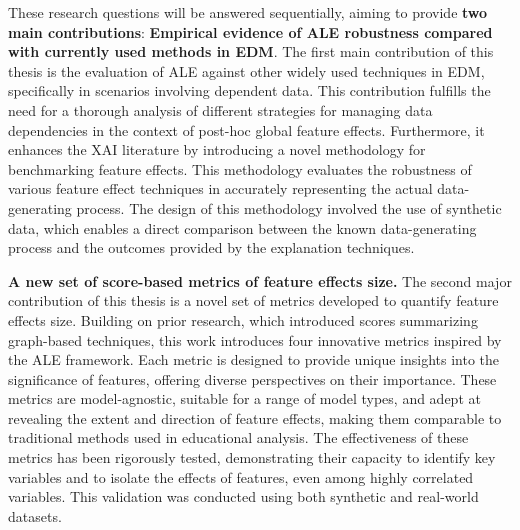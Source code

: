 These research questions will be answered sequentially, aiming to provide  \textbf{two main contributions}: \textbf{Empirical evidence of \gls{ALE} robustness compared with currently used methods in \gls{EDM}}. The first main contribution of this thesis is the evaluation of \gls{ALE} against other widely used techniques in \gls{EDM}, specifically in scenarios involving dependent data. This contribution fulfills the need for a thorough analysis of different strategies for managing data dependencies in the context of post-hoc global feature effects. Furthermore, it enhances the \gls{XAI} literature by introducing a novel methodology for benchmarking feature effects. This methodology evaluates the robustness of various feature effect techniques in accurately representing the actual data-generating process. The design of this methodology involved the use of synthetic data, which enables a direct comparison between the known data-generating process and the outcomes provided by the explanation techniques.

\textbf{A new set of score-based metrics of feature effects size.} The second major contribution of this thesis is a novel set of metrics developed to quantify feature effects size. Building on prior research, which introduced scores summarizing graph-based techniques, \cite{long1997regression, Greenwell2018AMeasure, Lee2023SHAPForecasting} this work introduces four innovative metrics inspired by the \gls{ALE} framework. Each metric is designed to provide unique insights into the significance of features, offering diverse perspectives on their importance. These metrics are model-agnostic, suitable for a range of model types, and adept at revealing the extent and direction of feature effects, making them comparable to traditional methods used in educational analysis. The effectiveness of these metrics has been rigorously tested, demonstrating their capacity to identify key variables and to isolate the effects of features, even among highly correlated variables. This validation was conducted using both synthetic and real-world datasets.

